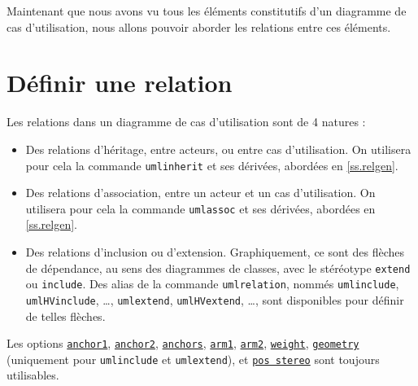 \documentclass[a4paper,11pt]{report}
\newcommand{\inputTikZ}[1]{%
  }%
\newcommand{\inputTikZ}[1]{%
    \texttt{[image: fig/\#1.pdf]}%
  }%
\begin{document}
\medskip

Maintenant que nous avons vu tous les éléments constitutifs d'un diagramme de cas d'utilisation, nous allons pouvoir aborder les relations entre ces éléments.

\section{Définir une relation}\label{s.userel}

Les relations dans un diagramme de cas d'utilisation sont de 4 natures :

\begin{itemize}
\item Des relations d'héritage, entre acteurs, ou entre cas d'utilisation. On utilisera pour cela la commande {\tt umlinherit} et ses dérivées, abordées en \autoref{ss.relgen}.
\item Des relations d'association, entre un acteur et un cas d'utilisation. On utilisera pour cela la commande {\tt umlassoc} et ses dérivées, abordées en \autoref{ss.relgen}.
\item Des relations d'inclusion ou d'extension. Graphiquement, ce sont des flèches de dépendance, au sens des diagrammes de classes, avec le stéréotype {\tt extend} ou {\tt include}. Des alias de la commande {\tt umlrelation}, nommés {\tt umlinclude}, {\tt umlHVinclude}, \ldots, {\tt umlextend}, {\tt umlHVextend}, \ldots, sont disponibles pour définir de telles flèches.
\end{itemize}

Les options \hyperlink{anchor1}{{\tt anchor1}}, \hyperlink{anchor2}{{\tt anchor2}}, \hyperlink{anchors}{{\tt anchors}}, \hyperlink{arm1}{{\tt arm1}}, \hyperlink{arm2}{{\tt arm2}}, \hyperlink{weight}{{\tt weight}}, \hyperlink{geometry}{{\tt geometry}} (uniquement pour {\tt umlinclude} et {\tt umlextend}), et \hyperlink{posstereo}{{\tt pos stereo}} sont toujours utilisables.

\medskip

\begin{minipage}{0.51\textwidth}

\end{minipage}
\begin{minipage}{0.49\textwidth}
\begin{center}
\inputTikZ{include-and-extend}
\end{center}
\end{minipage}

\medskip
\end{document}
